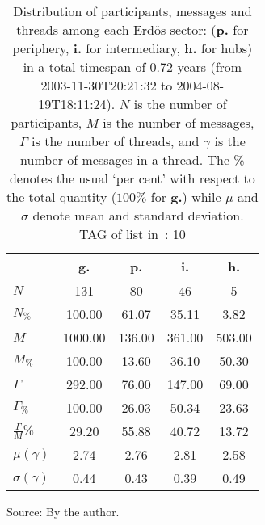 \begin{table}[h!]
\begin{center}
\caption{Distribution of participants, messages and threads among each Erd\"os sector: ({\bf p.} for periphery, {\bf i.} for intermediary, 
    {\bf h.} for hubs) in a total timespan of 0.72 years (from 2003-11-30T20:21:32 to 2004-08-19T18:11:24). $N$ is the number of participants, $M$ is the number of messages, $\Gamma$ is the number of threads, and $\gamma$ is the number of messages in a thread.
    The \% denotes the usual `per cent' with respect to the total quantity ($100\%$ for {\bf g.})
	while $\mu$ and $\sigma$ denote mean and standard deviation. TAG of list in~\cite{textTables}: 10}\label{geralListas}    
\begin{tabular}{l || c | c | c | c}\hline
 & {\bf g.} & {\bf p.} & {\bf i.} & {\bf h.} \\\hline\hline
$N$ & 131  & 80  & 46  & 5 \\
$N_{\%}$ & 100.00  & 61.07  & 35.11  & 3.82 \\\hline
$M$ & 1000.00  & 136.00  & 361.00  & 503.00 \\
$M_{\%}$ & 100.00  & 13.60  & 36.10  & 50.30 \\\hline
$\Gamma$ & 292.00  & 76.00  & 147.00  & 69.00 \\
$\Gamma_{\%}$ & 100.00  & 26.03  & 50.34  & 23.63 \\\hline
$\frac{\Gamma}{M}\%$ & 29.20  & 55.88  & 40.72  & 13.72 \\
$\mu(\gamma)$ & 2.74  & 2.76  & 2.81  & 2.58 \\
$\sigma(\gamma)$ & 0.44  & 0.43  & 0.39  & 0.49 \\\hline
\end{tabular}
\end{center}
\begin{flushleft}\footnotesize
		Source: By the author.\
\end{flushleft}
\end{table}
